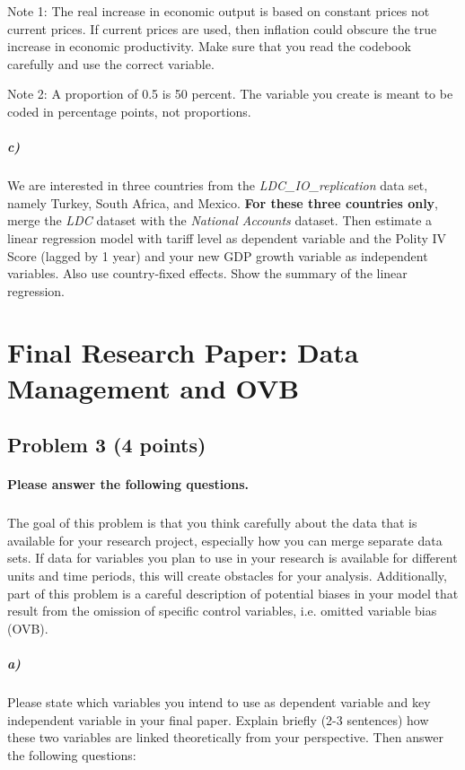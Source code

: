 \documentclass[12pt]{article}
\begin{document}
Note 1: The real increase in economic output is based on constant prices not current prices. If current prices are used, then inflation could obscure the true increase in economic productivity. Make sure that you read the codebook carefully and use the correct variable.

Note 2: A proportion of 0.5 is 50 percent. The variable you create is meant to be coded in percentage points, not proportions.

\subparagraph{c)} We are interested in three countries from the \textit{LDC\_IO\_replication} data set, namely Turkey, South Africa, and Mexico. \textbf{For these three countries only}, merge the \textit{LDC} dataset with the \textit{National Accounts} dataset. Then estimate a linear regression model with tariff level as dependent variable and the Polity IV Score (lagged by 1 year) and your new GDP growth variable as independent variables. Also use country-fixed effects. Show the summary of the linear regression.



\section*{Final Research Paper: Data Management and OVB}

\subsection*{Problem 3 (4 points)}

\paragraph{Please answer the following questions.}

\subparagraph{} The goal of this problem is that you think carefully about the data that is available for your research project, especially how you can merge separate data sets. If data for variables you plan to use in your research is available for different units and time periods, this will create obstacles for your analysis. Additionally, part of this problem is a careful description of potential biases in your model that result from the omission of specific control variables, i.e. omitted variable bias (OVB).

\subparagraph{a)} Please state which variables you intend to use as dependent variable and key independent variable in your final paper. Explain briefly (2-3 sentences) how these two variables are linked theoretically from your perspective. Then answer the following questions:
\end{document}
